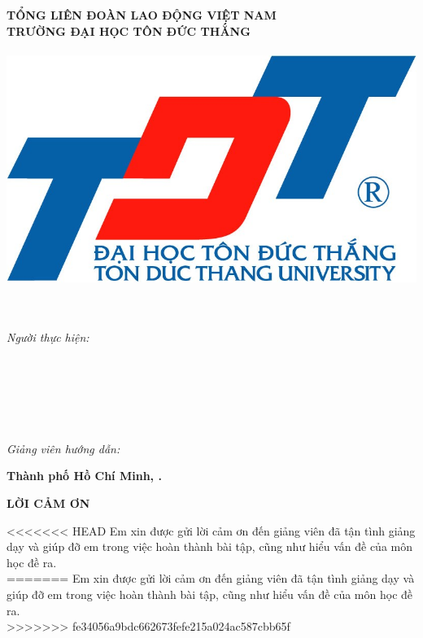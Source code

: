 \begin{center}
	\large{\textbf{TỔNG LIÊN ĐOÀN LAO ĐỘNG VIỆT NAM}} \\
	\large{\textbf{TRƯỜNG ĐẠI HỌC TÔN ĐỨC THẮNG}} \\
	\large{\textbf{\khoa}} \\\vspace*{1cm}	
	\includegraphics[width=0.5\linewidth]{lib/TDTlogo.jpg}\\\vspace*{1cm}	
	\uppercase{\Large{\textbf{\bai}}\\\vspace*{0.3cm}		
	\LARGE{\textbf{\de}}\\\vspace*{2cm}}
\begin{flushright}			
	\large{\textit{Người thực hiện:}} \\
		\large{\textbf{\tacgia}}\\
	\large{\textbf{\mstacgia}}\\
	\large{\textbf{\svhai}} \\
	\large{\textbf{\msvhai}}\\
	\large{\textbf{\svba}}\\
	\large{\textbf{\msvba}}\\

	\large{\textit{Giảng viên hướng dẫn:}} \\
	\large{\textbf{\gvhd}} 
	\vspace*{2cm}
\end{flushright}
	\large{\textbf{Thành phố Hồ Chí Minh, \nam.}}
\end{center}	
	\newpage
\begin{center}
	\Large{\textbf{LỜI CẢM ƠN}}
\end{center}
<<<<<<< HEAD
	Em xin được gửi lời cảm ơn đến giảng viên \gvhd \mbox{}đã tận tình giảng dạy và giúp đỡ em trong việc hoàn thành bài tập, cũng như hiểu vấn đề của môn học đề ra.\\
=======
	Em xin được gửi lời cảm ơn đến giảng viên \gvhd \mbox{} đã tận tình giảng dạy và giúp đỡ em trong việc hoàn thành bài tập, cũng như hiểu vấn đề của môn học đề ra.\\
>>>>>>> fe34056a9bdc662673fefe215a024ac587cbb65f
	
